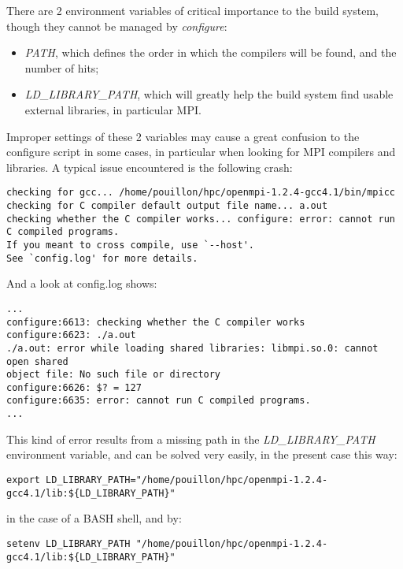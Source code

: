There are 2 environment variables of critical importance to the build
system, though they cannot be managed by \textit{configure}:
\begin{itemize}
 \item \textit{PATH}, which defines the order in which the compilers
 will be found, and the number of hits;
 \item \textit{LD\_LIBRARY\_PATH}, which will greatly help the build
 system find usable external libraries, in particular MPI.
\end{itemize}
Improper settings of these 2 variables may cause a great confusion to
the configure script in some cases, in particular when looking for MPI
compilers and libraries. A typical issue encountered is the following
crash:

{\scriptsize
\begin{verbatim}
checking for gcc... /home/pouillon/hpc/openmpi-1.2.4-gcc4.1/bin/mpicc
checking for C compiler default output file name... a.out
checking whether the C compiler works... configure: error: cannot run C compiled programs.
If you meant to cross compile, use `--host'.
See `config.log' for more details.
\end{verbatim}
}

And a look at config.log shows:

{\scriptsize
\begin{verbatim}
...
configure:6613: checking whether the C compiler works
configure:6623: ./a.out
./a.out: error while loading shared libraries: libmpi.so.0: cannot open shared
object file: No such file or directory
configure:6626: $? = 127
configure:6635: error: cannot run C compiled programs.
...
\end{verbatim}
}

This kind of error results from a missing path in the
\textit{LD\_LIBRARY\_PATH} environment variable, and can be solved very
easily, in the present case this way:

{\scriptsize
\begin{verbatim}
export LD_LIBRARY_PATH="/home/pouillon/hpc/openmpi-1.2.4-gcc4.1/lib:${LD_LIBRARY_PATH}"
\end{verbatim}
}

in the case of a BASH shell, and by:

{\scriptsize
\begin{verbatim}
setenv LD_LIBRARY_PATH "/home/pouillon/hpc/openmpi-1.2.4-gcc4.1/lib:${LD_LIBRARY_PATH}"
\end{verbatim}
}

